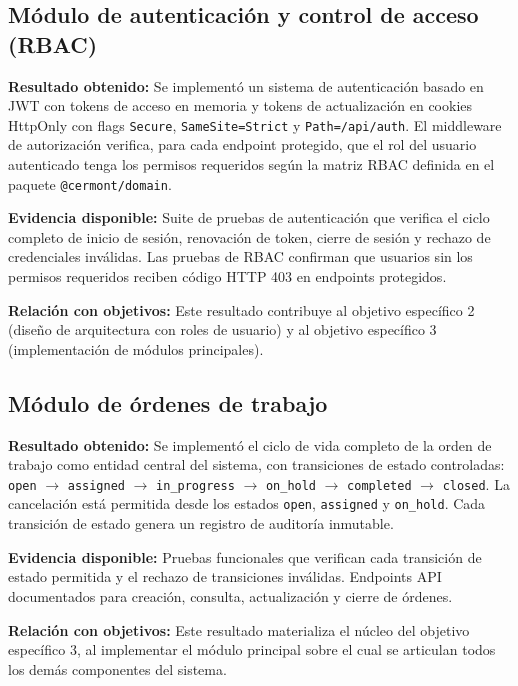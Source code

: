 \subsection{Módulo de autenticación y control de acceso (RBAC)}

\textbf{Resultado obtenido:} Se implementó un sistema de autenticación basado en JWT con tokens de acceso en memoria y tokens de actualización en cookies HttpOnly con flags \texttt{Secure}, \texttt{SameSite=Strict} y \texttt{Path=/api/auth}. El middleware de autorización verifica, para cada endpoint protegido, que el rol del usuario autenticado tenga los permisos requeridos según la matriz RBAC definida en el paquete \texttt{@cermont/domain}.

\textbf{Evidencia disponible:} Suite de pruebas de autenticación que verifica el ciclo completo de inicio de sesión, renovación de token, cierre de sesión y rechazo de credenciales inválidas. Las pruebas de RBAC confirman que usuarios sin los permisos requeridos reciben código HTTP 403 en endpoints protegidos.

\textbf{Relación con objetivos:} Este resultado contribuye al objetivo específico 2 (diseño de arquitectura con roles de usuario) y al objetivo específico 3 (implementación de módulos principales).

\subsection{Módulo de órdenes de trabajo}

\textbf{Resultado obtenido:} Se implementó el ciclo de vida completo de la orden de trabajo como entidad central del sistema, con transiciones de estado controladas: \texttt{open} $\rightarrow$ \texttt{assigned} $\rightarrow$ \texttt{in\_progress} $\rightarrow$ \texttt{on\_hold} $\rightarrow$ \texttt{completed} $\rightarrow$ \texttt{closed}. La cancelación está permitida desde los estados \texttt{open}, \texttt{assigned} y \texttt{on\_hold}. Cada transición de estado genera un registro de auditoría inmutable.

\textbf{Evidencia disponible:} Pruebas funcionales que verifican cada transición de estado permitida y el rechazo de transiciones inválidas. Endpoints API documentados para creación, consulta, actualización y cierre de órdenes.

\textbf{Relación con objetivos:} Este resultado materializa el núcleo del objetivo específico 3, al implementar el módulo principal sobre el cual se articulan todos los demás componentes del sistema.

